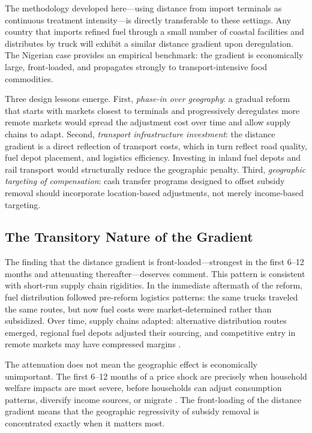 \documentclass[12pt]{article}
\begin{document}
The methodology developed here---using distance from import terminals as continuous treatment intensity---is directly transferable to these settings. Any country that imports refined fuel through a small number of coastal facilities and distributes by truck will exhibit a similar distance gradient upon deregulation. The Nigerian case provides an empirical benchmark: the gradient is economically large, front-loaded, and propagates strongly to transport-intensive food commodities.

Three design lessons emerge. First, \textit{phase-in over geography}: a gradual reform that starts with markets closest to terminals and progressively deregulates more remote markets would spread the adjustment cost over time and allow supply chains to adapt. Second, \textit{transport infrastructure investment}: the distance gradient is a direct reflection of transport costs, which in turn reflect road quality, fuel depot placement, and logistics efficiency. Investing in inland fuel depots and rail transport would structurally reduce the geographic penalty. Third, \textit{geographic targeting of compensation}: cash transfer programs designed to offset subsidy removal should incorporate location-based adjustments, not merely income-based targeting.

\subsection{The Transitory Nature of the Gradient}

The finding that the distance gradient is front-loaded---strongest in the first 6--12 months and attenuating thereafter---deserves comment. This pattern is consistent with short-run supply chain rigidities. In the immediate aftermath of the reform, fuel distribution followed pre-reform logistics patterns: the same trucks traveled the same routes, but now fuel costs were market-determined rather than subsidized. Over time, supply chains adapted: alternative distribution routes emerged, regional fuel depots adjusted their sourcing, and competitive entry in remote markets may have compressed margins \citep{Fackler2001,Aker2010}.

The attenuation does not mean the geographic effect is economically unimportant. The first 6--12 months of a price shock are precisely when household welfare impacts are most severe, before households can adjust consumption patterns, diversify income sources, or migrate \citep{Friedman2013}. The front-loading of the distance gradient means that the geographic regressivity of subsidy removal is concentrated exactly when it matters most.
\end{document}
